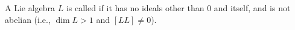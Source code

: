 A Lie algebra $L$ is called  if it has no ideals other than 0 and itself, and is not abelian (i.e., $\dim L > 1$ and $[LL] \neq 0$).
